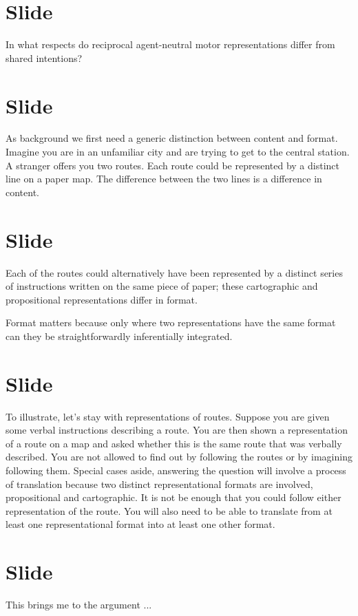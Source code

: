 \documentclass[12pt,\papersize]{extarticle}
\begin{document}
\section{Slide}
In what respects do reciprocal agent-neutral motor representations differ from shared intentions?


\section{Slide}
As background we first need a generic distinction between content and format. Imagine you are in an unfamiliar city and are trying to get to the central station. A stranger offers you two routes. Each route could be represented by a distinct line on a paper map. The difference between the two lines is a difference in content. 


\section{Slide}
Each of the routes could alternatively have been represented by a distinct series of instructions written on the same piece of paper; these cartographic and propositional representations differ in format. 

Format matters because only where two representations have the same format can they be straightforwardly inferentially integrated.



\section{Slide}
To illustrate, let’s stay with representations of routes.  
Suppose you are given some verbal instructions describing a route. You are then shown a representation of a route on a map and asked whether this is the same route that was verbally described. You are not allowed to find out by following the routes or by imagining following them. 
Special cases aside, answering the question will involve a process of translation because two distinct representational formats are involved, propositional and cartographic. It is not be enough that you could follow either representation of the route. You will also need to be able to translate from at least one representational format into at least one other format. 



\section{Slide}
This brings me to the argument ...
\end{document}
